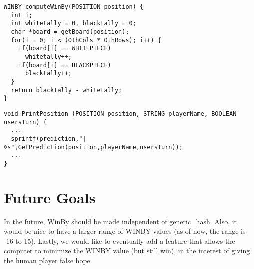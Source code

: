 \documentclass[pdftex]{article}
\begin{document}
\begin{verbatim}
WINBY computeWinBy(POSITION position) {
  int i;
  int whitetally = 0, blacktally = 0;
  char *board = getBoard(position);  
  for(i = 0; i < (OthCols * OthRows); i++) {
    if(board[i] == WHITEPIECE)
      whitetally++;
    if(board[i] == BLACKPIECE)
      blacktally++;
  }
  return blacktally - whitetally;
}
\end{verbatim}

\begin{verbatim}
void PrintPosition (POSITION position, STRING playerName, BOOLEAN usersTurn) {
  ...
  sprintf(prediction,"| %s",GetPrediction(position,playerName,usersTurn));
  ...
}
\end{verbatim}

\section{Future Goals}
\indent \indent In the future, WinBy should be made independent of generic\_hash.  Also, it would
be nice to have a larger range of WINBY values (as of now, the range is -16 to 15).
Lastly, we would like to eventually add a feature that allows the computer to minimize the
WINBY value (but still win), in the interest of giving the human player false hope.
\end{document}
